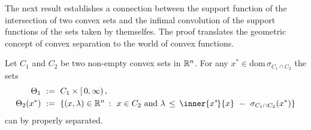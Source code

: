The next result establishes a connection between the support function of the intersection of two convex sets and the infimal convolution of the support functions of the sets taken by themselfes.
The proof translates the geometric concept of convex separation to the world of convex functions.

\begin{lemma}
  Let $C_1$ and $C_2$ be two non-empty convex sets in $\mathbb{R}^n$.
  For any
  $ x^* \in \mathrm{dom}\, \sigma_{C_1\cap C_2} $
  the sets
  \begin{align*}
    \Theta_1
    &
    \ :=\ 
    C_1 \times [\,0,\infty)
    \,,
    \\
    \Theta_2
    (x^*)
    &
    \ :=\ 
    \left\{ 
      (x,\lambda)\in \R^n
      \ 
      \colon
      \ 
      x \in C_2
      \ 
      \text{and}
      \ 
      \lambda
      \,
      \le
      \,
      \inner{x^*\!}{x} 
      \ 
      -
      \ 
      \sigma_{C_1\cap C_2}(x^*)
    \right\}
  \end{align*}
  can by properly separated.
\end{lemma}
